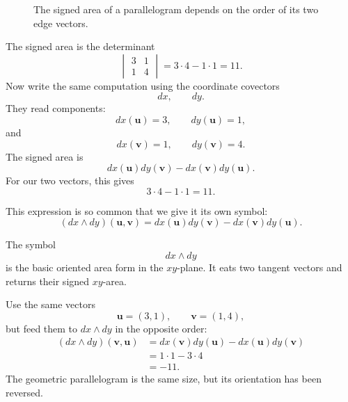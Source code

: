 \begin{figure}[h]
\centering
{}
\caption{The signed area of a parallelogram depends on the order of its two edge vectors.}
\end{figure}

The signed area is the determinant
\[
    \begin{vmatrix}
        3&1\\
        1&4
    \end{vmatrix}
    =
    3\cdot4-1\cdot1
    =
    11.
\]
Now write the same computation using the coordinate covectors
\[
    dx,\qquad dy.
\]
They read components:
\[
    dx(\mathbf u)=3,
    \qquad
    dy(\mathbf u)=1,
\]
and
\[
    dx(\mathbf v)=1,
    \qquad
    dy(\mathbf v)=4.
\]
The signed area is
\[
    dx(\mathbf u)dy(\mathbf v)-dx(\mathbf v)dy(\mathbf u).
\]
For our two vectors, this gives
\[
    3\cdot4-1\cdot1=11.
\]

This expression is so common that we give it its own symbol:
\[
\boxed{
    (dx\wedge dy)(\mathbf u,\mathbf v)
    =
    dx(\mathbf u)dy(\mathbf v)-dx(\mathbf v)dy(\mathbf u).
}
\]

The symbol
\[
    dx\wedge dy
\]
is the basic oriented area form in the \(xy\)-plane.  It eats two tangent vectors and
returns their signed \(xy\)-area.

\begin{example}
Use the same vectors
\[
    \mathbf u=(3,1),
    \qquad
    \mathbf v=(1,4),
\]
but feed them to \(dx\wedge dy\) in the opposite order:
\[
\begin{aligned}
    (dx\wedge dy)(\mathbf v,\mathbf u)
    &=
    dx(\mathbf v)dy(\mathbf u)-dx(\mathbf u)dy(\mathbf v)\\
    &=
    1\cdot1-3\cdot4\\
    &=
    -11.
\end{aligned}
\]
The geometric parallelogram is the same size, but its orientation has been reversed.
\end{example}

